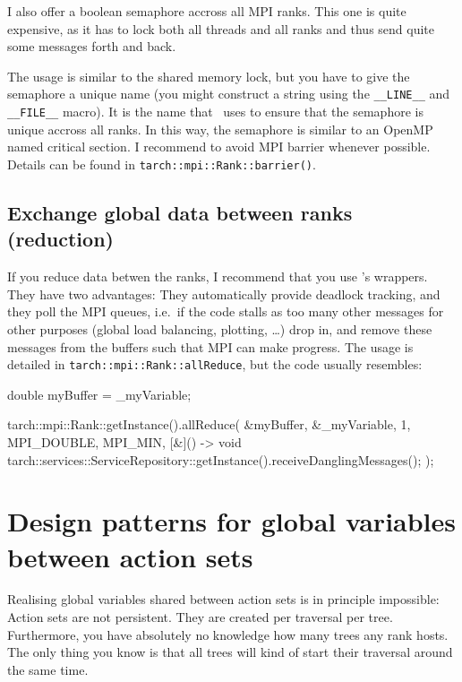 I also offer a boolean semaphore accross all MPI ranks. This one is quite
expensive, as it has to lock both all threads and all ranks and thus send
quite some messages forth and back. 

The usage is similar to the shared memory lock, but you have to give the
semaphore a unique name (you might construct a string using the
\texttt{\_\_LINE\_\_} and \texttt{\_\_FILE\_\_} macro). 
It is the name that \Peano\ uses to ensure that the semaphore is unique accross
all ranks.
In this way, the semaphore is similar to an OpenMP named critical section.
I recommend to avoid MPI barrier whenever possible.
Details can be found in \texttt{tarch::mpi::Rank::barrier()}.



\subsection{Exchange global data between ranks (reduction)}
\label{section:parallel-programming:shared-mem:reductions}

If you reduce data betwen the ranks, I recommend that you use \Peano's wrappers.
They have two advantages: 
They automatically provide deadlock tracking, and they poll the MPI queues,
i.e.~if the code stalls as too many other messages for other purposes (global
load balancing, plotting, \ldots) drop in, and remove these messages from the
buffers such that MPI can make progress. The usage is detailed in
\texttt{tarch::mpi::Rank::allReduce}, but the code usually resembles:

\begin{code}
double myBuffer = _myVariable;

tarch::mpi::Rank::getInstance().allReduce(
  &myBuffer,
  &_myVariable,
  1, MPI_DOUBLE,
  MPI_MIN,
  [&]() -> void { tarch::services::ServiceRepository::getInstance().receiveDanglingMessages(); }
);
\end{code}


\section{Design patterns for global variables between action sets}

Realising global variables shared between action sets is in principle
impossible: 
Action sets are not persistent. 
They are created per traversal per tree.
Furthermore, you have absolutely no knowledge how many trees any rank hosts.
The only thing you know is that all trees will kind of start their traversal
around the same time.


